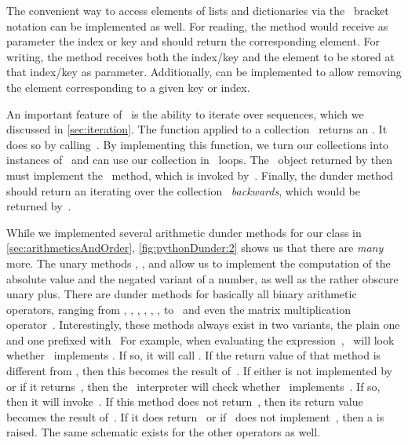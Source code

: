 The convenient way to access elements of lists and dictionaries via the \pythonil{[...]}\pythonIdx{[\idxdots]}~bracket notation can be implemented as well.
For reading, the  method would receive as parameter the index or key and should return the corresponding element.
For writing, the  method receives both the index/key and the element to be stored at that index/key as parameter.
Additionally,  can be implemented to allow removing the element corresponding to a given key or index.

An important feature of \python\ is the ability to iterate over sequences, which we discussed in \cref{sec:iteration}.
The  function applied to a collection~ returns an .
It does so by calling~.
By implementing this function, we turn our collections into instances of~ and can use our collection in ~loops.
The ~object returned by  then must implement the~ method, which is invoked by~.
Finally, the  dunder method should return an  iterating over the collection~ \emph{backwards}, which would be returned by~.

While we implemented several arithmetic dunder methods for our  class in \cref{sec:arithmeticsAndOrder}, \cref{fig:pythonDunder:2} shows us that there are \emph{many} more.
The unary methods , , and  allow us to implement the computation of the absolute value and the negated variant of a number, as well as the rather obscure unary plus.
There are dunder methods for basically all binary arithmetic operators, ranging from \pythonilIdx{+}, \pythonilIdx{-}, \pythonilIdx{*}, \pythonilIdx{/}, \pythonilIdx{//}, \pythonilIdx{\%}, to~\pythonilIdx{**} and even the matrix multiplication operator~.
Interestingly, these methods always exist in two variants, the plain one and one prefixed with~
For example, when evaluating the expression~, \python\ will look whether ~implements .
If so, it will call .
If the return value of that method is different from , then this becomes the result of~.
If either  is not implemented by~ or if it returns~, then the \python\ interpreter will check whether ~implements~.
If so, then it will invoke~.
If this method does not return~, then its return value becomes the result of~.
If it does return~ or if~ does not implement~, then a  is raised.
The same schematic exists for the other operators as well.

